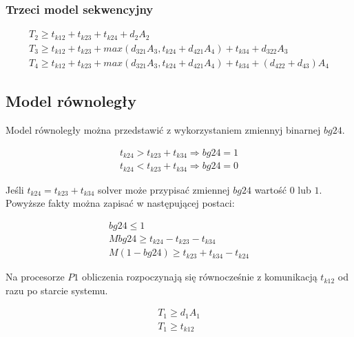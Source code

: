 \subsubsection{Trzeci model sekwencyjny}

\begin{equation} \label{eq:sek3}
\begin{array}{l}
T_{2} \geq t_{k12} + t_{k23} + t_{k24} + d_{2}A_{2} \\
T_{3} \geq t_{k12} + t_{k23} + max(d_{321}A_{3}, t_{k24} + d_{421}A_{4}) + t_{k34} + d_{322}A_{3} \\
T_{4} \geq t_{k12} + t_{k23} + max(d_{321}A_{3}, t_{k24} + d_{421}A_{4}) + t_{k34} + (d_{422} + d_{43})A_{4}
\end{array}
\end{equation}

\subsection{Model równoległy}

Model równoległy można przedstawić z wykorzystaniem zmiennyj binarnej $bg24$.

\begin{equation} \label{eq:bg24}
\begin{array}{l}
t_{k24} > t_{k23} + t_{k34} \Rightarrow bg24 = 1 \\
t_{k24} < t_{k23} + t_{k34} \Rightarrow bg24 = 0
\end{array}
\end{equation}

Jeśli $t_{k24} = t_{k23} + t_{k34}$ solver może przypisać zmiennej $bg24$ wartość $0$ lub $1$.
Powyższe fakty można zapisać w następującej postaci:

\begin{equation}
\begin{array}{l}
bg24 \leq 1 \\
Mbg24 \geq t_{k24} - t_{k23} - t_{k34} \\
M(1 - bg24) \geq t_{k23} + t_{k34} - t_{k24}
\end{array}
\end{equation}

Na procesorze $P1$ obliczenia rozpoczynają się równocześnie z komunikacją $t_{k12}$ od razu po starcie systemu.

\begin{equation}
\begin{array}{l}
T_{1} \geq d_{1}A_{1} \\
T_{1} \geq t_{k12}
\end{array}
\end{equation}

